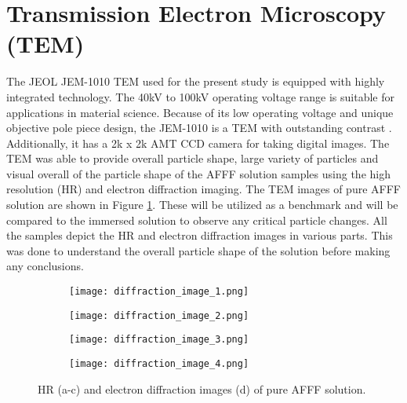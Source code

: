 \section{Transmission Electron Microscopy (TEM)}
The JEOL JEM-1010 TEM used for the present study is equipped with highly integrated technology. The 40kV to 100kV operating voltage range is suitable for applications in material science. Because of its low operating voltage and unique objective pole piece design, the JEM-1010 is a TEM with outstanding contrast \cite{krimm1986vibrational}. Additionally, it has a 2k x 2k AMT CCD camera for taking digital images. The TEM was able to provide overall particle shape, large variety of particles and visual overall of the particle shape of the AFFF solution samples using the high resolution (HR) and electron diffraction imaging.  
The TEM images of pure AFFF solution are shown in Figure \ref{ch5:figure:pure_afff_images}. These will be utilized as a benchmark and will be compared to the immersed solution to observe any critical particle changes. All the samples depict the HR and electron diffraction images in various parts. This was done to understand the overall particle shape of the solution before making any conclusions. 

\begin{figure}[H]
\centering

\begin{subfigure}{.45\textwidth}
    \texttt{[image: diffraction\_image\_1.png]}
\end{subfigure}
\hspace{-1em}
\begin{subfigure}{.45\textwidth}
    \texttt{[image: diffraction\_image\_2.png]}
\end{subfigure}
\par\bigskip
\begin{subfigure}{.45\textwidth}
    \texttt{[image: diffraction\_image\_3.png]}
\end{subfigure}
\hspace{-1em}
\begin{subfigure}{.45\textwidth}
    \texttt{[image: diffraction\_image\_4.png]}
\end{subfigure}

\caption{HR (a-c) and electron diffraction images (d) of pure AFFF solution.}
\label{ch5:figure:pure_afff_images}
\end{figure}


